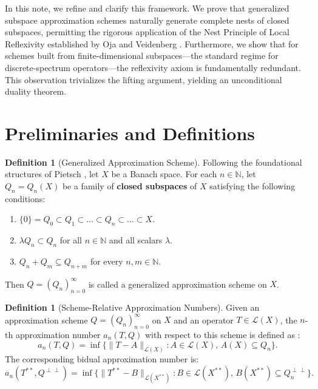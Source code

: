 \documentclass[11pt,reqno]{amsart}
\theoremstyle{definition}
\newtheorem{definition}[theorem]{Definition}
\begin{document}
In this note, we refine and clarify this framework. We prove that generalized subspace approximation schemes naturally generate complete nests of closed subspaces, permitting the rigorous application of the Nest Principle of Local Reflexivity established by Oja and Veidenberg \cite{OV2017}. Furthermore, we show that for schemes built from finite-dimensional subspaces---the standard regime for discrete-spectrum operators---the reflexivity axiom is fundamentally redundant. This observation trivializes the lifting argument, yielding an unconditional duality theorem.

\section{Preliminaries and Definitions}

\begin{definition}[Generalized Approximation Scheme]
Following the foundational structures of Pietsch \cite{Pietsch1981}, let $X$ be a Banach space. For each $n \in \mathbb{N}$, let $Q_n = Q_n(X)$ be a family of \textbf{closed subspaces} of $X$ satisfying the following conditions:
\begin{enumerate}
    \item[(GA1)] $\{0\} = Q_0 \subset Q_1 \subset \dots \subset Q_n \subset \dots \subset X$.
    \item[(GA2)] $\lambda Q_n \subset Q_n$ for all $n \in \mathbb{N}$ and all scalars $\lambda$.
    \item[(GA3)] $Q_n + Q_m \subseteq Q_{n+m}$ for every $n, m \in \mathbb{N}$.
\end{enumerate}
Then $Q = (Q_n)_{n=0}^\infty$ is called a generalized approximation scheme on $X$.
\end{definition}

\begin{definition}[Scheme-Relative Approximation Numbers]
Given an approximation scheme $Q = (Q_n)_{n=0}^\infty$ on $X$ and an operator $T \in \mathcal{L}(X)$, the $n$-th approximation number $a_n(T,Q)$ with respect to this scheme is defined as \cite{AT2023}:
\begin{equation}
a_n(T, Q) = \inf \{ \|T - A\|_{\mathcal{L}(X)} : A \in \mathcal{L}(X), \, A(X) \subseteq Q_n \}.
\end{equation}
The corresponding bidual approximation number is:
\begin{equation}
a_n(T^{**}, Q^{\perp\perp}) = \inf \{ \|T^{**} - B\|_{\mathcal{L}(X^{**})} : B \in \mathcal{L}(X^{**}), \, B(X^{**}) \subseteq Q_n^{\perp\perp} \}.
\end{equation}
\end{definition}
\end{document}
